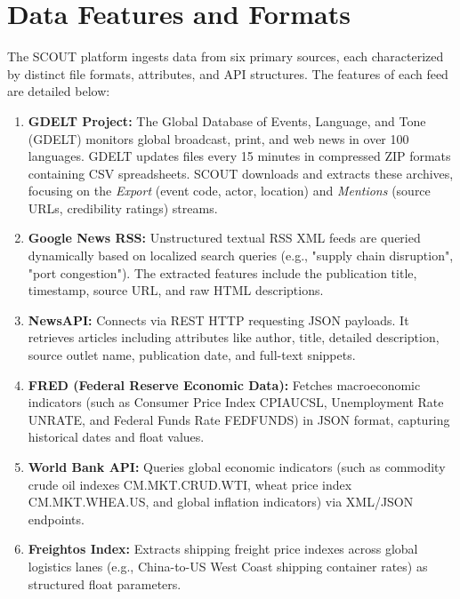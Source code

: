 \documentclass[12pt]{report}
\begin{document}
\newpage
\section{Data Features and Formats}
The SCOUT platform ingests data from six primary sources, each characterized by distinct file formats, attributes, and API structures. The features of each feed are detailed below:
\begin{enumerate}
  \item \textbf{GDELT Project:} The Global Database of Events, Language, and Tone (GDELT) monitors global broadcast, print, and web news in over 100 languages. GDELT updates files every 15 minutes in compressed ZIP formats containing CSV spreadsheets. SCOUT downloads and extracts these archives, focusing on the \textit{Export} (event code, actor, location) and \textit{Mentions} (source URLs, credibility ratings) streams.
  \item \textbf{Google News RSS:} Unstructured textual RSS XML feeds are queried dynamically based on localized search queries (e.g., "supply chain disruption", "port congestion"). The extracted features include the publication title, timestamp, source URL, and raw HTML descriptions.
  \item \textbf{NewsAPI:} Connects via REST HTTP requesting JSON payloads. It retrieves articles including attributes like author, title, detailed description, source outlet name, publication date, and full-text snippets.
  \item \textbf{FRED (Federal Reserve Economic Data):} Fetches macroeconomic indicators (such as Consumer Price Index CPIAUCSL, Unemployment Rate UNRATE, and Federal Funds Rate FEDFUNDS) in JSON format, capturing historical dates and float values.
  \item \textbf{World Bank API:} Queries global economic indicators (such as commodity crude oil indexes CM.MKT.CRUD.WTI, wheat price index CM.MKT.WHEA.US, and global inflation indicators) via XML/JSON endpoints.
  \item \textbf{Freightos Index:} Extracts shipping freight price indexes across global logistics lanes (e.g., China-to-US West Coast shipping container rates) as structured float parameters.
\end{enumerate}
\end{document}
